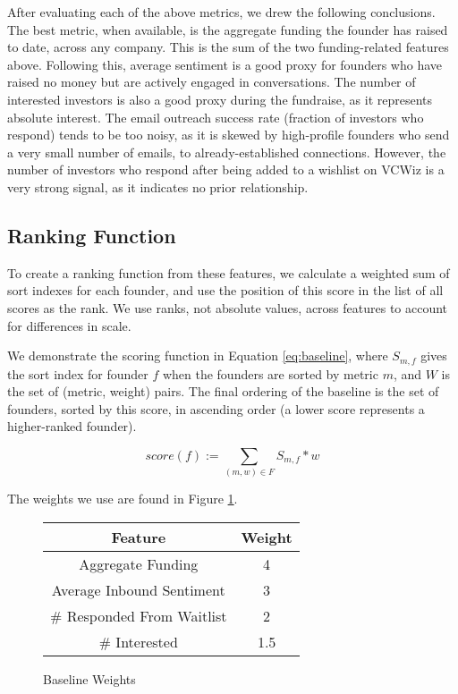After evaluating each of the above metrics, we drew the following conclusions. The best metric, when available, is the aggregate funding the founder has raised to date, across any company. This is the sum of the two funding-related features above. Following this, average sentiment is a good proxy for founders who have raised no money but are actively engaged in conversations. The number of interested investors is also a good proxy during the fundraise, as it represents absolute interest. The email outreach success rate (fraction of investors who respond) tends to be too noisy, as it is skewed by high-profile founders who send a very small number of emails, to already-established connections. However, the number of investors who respond after being added to a wishlist on VCWiz is a very strong signal, as it indicates no prior relationship.

\subsection{Ranking Function}

To create a ranking function from these features, we calculate a weighted sum of sort indexes for each founder, and use the position of this score in the list of all scores as the rank. We use ranks, not absolute values, across features to account for differences in scale.

We demonstrate the scoring function in Equation \ref{eq:baseline}, where $S_{m, f}$ gives the sort index for founder $f$ when the founders are sorted by metric $m$, and $W$ is the set of (metric, weight) pairs. The final ordering of the baseline is the set of founders, sorted by this score, in ascending order (a lower score represents a higher-ranked founder).

\begin{equation}
\label{eq:baseline}
  score(f) := \sum_{(m, w) \in F} S_{m, f} * w
\end{equation}

\noindent The weights we use are found in Figure \ref{fig:nfr:baseline:weights}.

\begin{figure}[ht]
\begin{tabular}{c | c}
\textbf{Feature}           & \textbf{Weight} \\\hline
Aggregate Funding          & 4 \\\hline
Average Inbound Sentiment  & 3 \\\hline
\# Responded From Waitlist & 2 \\\hline
\# Interested              & 1.5
\end{tabular}
\centering
\caption{Baseline Weights}
\label{fig:nfr:baseline:weights}
\end{figure}

